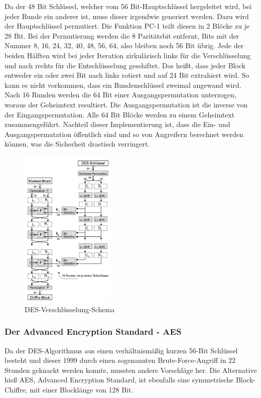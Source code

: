\documentclass[11pt]{scrartcl}
\begin{document}
Da der 48 Bit Schlüssel, welcher vom 56 Bit-Hauptschlüssel hergeleitet wird, bei jeder Runde ein anderer ist, muss dieser irgendwie generiert werden. Dazu wird der Hauptschlüssel permutiert. Die Funktion PC-1 teilt diesen in 2 Blöcke zu je 28 Bit. Bei der Permutierung werden die 8 Paritätsbit entfernt, Bits mit der Nummer 8, 16, 24, 32, 40, 48, 56, 64, also bleiben noch 56 Bit übrig. Jede der beiden Hälften wird bei jeder Iteration zirkulärisch links für die Verschlüsselung und nach rechts für die Entschlüsselung gesshiftet. Das heißt, dass jeder Block entweder ein oder zwei Bit nach links rotiert und auf 24 Bit extrahiert wird. So kann es nicht vorkommen, dass ein Rundenschlüssel zweimal angewand wird.\\
\grqq{}Nach 16 Runden werden die 64 Bit einer Ausgangspermutation unterzogen\grqq{}\cite{2}, woraus der Geheimtext resultiert. Die Ausgangspermutation ist die inverse von der Eingangspermutation. Alle 64 Bit Blöcke werden zu einem Geheimtext zusammengeführt. Nachteil dieser Implementierung ist, dass die Ein- und Ausgangspermutation öffentlich sind und so von Angreifern berechnet werden können, was die Sicherheit drastisch verringert. \cite{2}\cite{4}
\begin{figure}[H]
\includegraphics[width=0.40\textwidth]{Bilder/DES/DES_Schema}
	\caption{DES-Verschlüsselung-Schema \cite{3}}
	\label{fig5}
\end{figure}

\subsubsection{Der Advanced Encryption Standard - AES}
\label{sec:advanced-encryotion-standard}
Da der DES-Algorithmus aus einen verhältnismäßig kurzen 56-Bit Schlüssel besteht und dieser 1999 durch einen sogenannten Brute-Force-Angriff in 22 Stunden geknackt werden konnte, mussten andere Vorschläge her. Die Alternative hieß AES, Advanced Encryption Standard, ist ebenfalls eine symmetrische Block-Chiffre, mit einer Blocklänge von 128 Bit. \cite{3}\\
\end{document}
